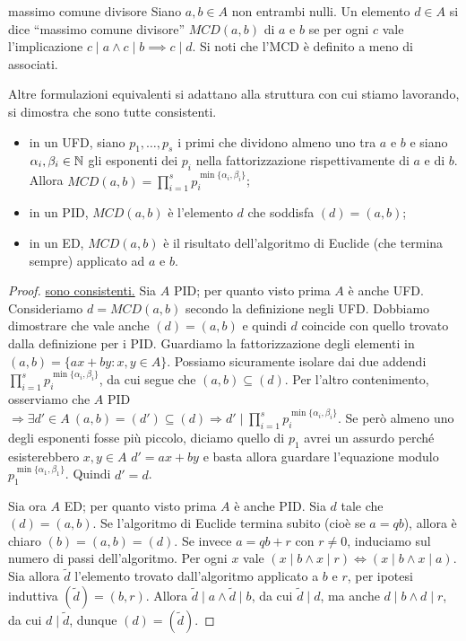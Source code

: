 \begin{definition}{massimo comune divisore}
    Siano $a, b \in A$ non entrambi nulli. Un elemento $d \in A$ si dice ``massimo comune divisore'' $MCD(a, b)$ di $a$ e $b$ se per ogni $c$ vale l'implicazione $c \mid a \land c \mid b \implies c \mid d$. Si noti che l'MCD è definito a meno di associati.

    Altre formulazioni equivalenti si adattano alla struttura con cui stiamo lavorando, si dimostra che sono tutte consistenti.
    \begin{itemize}
        \item in un UFD, siano $p_1,\dots,p_s$ i primi che dividono almeno uno tra $a$ e $b$ e siano $\alpha_i, \beta_i \in \mathbb{N}$ gli esponenti dei $p_i$ nella fattorizzazione rispettivamente di $a$ e di $b$. Allora $MCD(a,b) = \prod_{i=1}^s p_i^{\min \{ \alpha_i,\beta_i \} }$;
        \item in un PID, $MCD(a,b)$ è l'elemento $d$ che soddisfa $(d) = (a,b)$;
        \item in un ED, $MCD(a,b)$ è il risultato dell'algoritmo di Euclide (che termina sempre) applicato ad $a$ e $b$.
    \end{itemize}
\end{definition}
\begin{proof}
    \underline{sono consistenti.} 
    Sia $A$ PID; per quanto visto prima $A$ è anche UFD. Consideriamo $d = MCD(a,b)$ secondo la definizione negli UFD. Dobbiamo dimostrare che vale anche $(d) = (a,b)$ e quindi $d$ coincide con quello trovato dalla definizione per i PID. Guardiamo la fattorizzazione degli elementi in $(a,b) = \{ax+by : x,y \in A\}$. Possiamo sicuramente isolare dai due addendi $\prod_{i=1}^s p_i^{\min\{\alpha_i,\beta_i\}}$, da cui segue che $(a,b) \subseteq (d)$. Per l'altro contenimento, osserviamo che $A$ PID $\Rightarrow \exists d' \in A \ (a,b) = (d') \subseteq (d) \Rightarrow d' \mid \prod_{i=1}^s p_i^{\min\{\alpha_i,\beta_i\}}$. Se però almeno uno degli esponenti fosse più piccolo, diciamo quello di $p_1$ avrei un assurdo perché esisterebbero $x,y \in A$ $d' = ax+by$ e basta allora guardare l'equazione modulo $p_1^{\min\{\alpha_1,\beta_1\}}$. Quindi $d' = d$.
    
    Sia ora $A$ ED; per quanto visto prima $A$ è anche PID. Sia $d$ tale che $(d) = (a,b)$. Se l'algoritmo di Euclide termina subito (cioè se $a = qb$), allora è chiaro $(b) = (a, b) = (d)$. Se invece $a = qb + r$ con $r \neq 0$, induciamo sul numero di passi dell'algoritmo. Per ogni $x$ vale $(x \mid b \land x \mid r) \iff (x \mid b \land x \mid a)$. Sia allora $\tilde d$ l'elemento trovato dall'algoritmo applicato a $b$ e $r$, per ipotesi induttiva $(\tilde d) = (b, r)$. Allora $\tilde d \mid a \land \tilde d \mid b$, da cui $\tilde d \mid d$, ma anche $d \mid b \land d \mid r$, da cui $d \mid \tilde d$, dunque $(d) = (\tilde d)$.
\end{proof}
